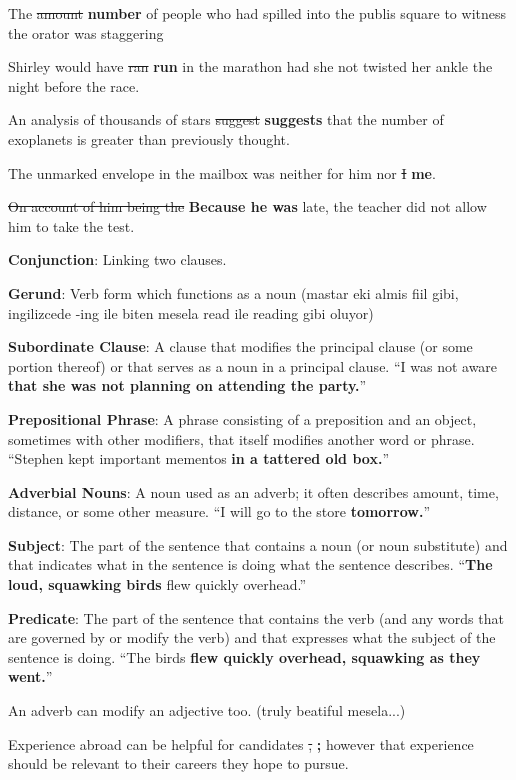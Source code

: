 \documentclass[12pt, a4paper]{ximera}
\begin{document}
The \sout{amount} \textbf{number} of people who had spilled into the publis square to witness the orator was staggering

Shirley would have \sout{ran} \textbf{run} in the marathon had she not twisted her ankle the night before the race.

An analysis of thousands of stars \sout{suggest} \textbf{suggests} that the number of exoplanets is greater than previously thought.

The unmarked envelope in the mailbox was neither for him nor \sout{I} \textbf{me}.

\sout{On account of him being the} \textbf{Because he was} late, the teacher did not allow him to take the test.

\textbf{Conjunction}: Linking two clauses.

\textbf{Gerund}: Verb form which functions as a noun (mastar eki almis fiil gibi, ingilizcede -ing ile biten mesela read ile reading gibi oluyor)

\textbf{Subordinate Clause}: A clause that modifies the principal clause (or some portion thereof) or that serves as a noun in a principal clause. ``I was not aware \textbf{that she was not planning on attending the party.}''

\textbf{Prepositional Phrase}: A phrase consisting of a preposition and an object, sometimes with other modifiers, that itself modifies another word or phrase. ``Stephen kept important mementos \textbf{in a tattered old box.}''

\textbf{Adverbial Nouns}: A noun used as an adverb; it often describes amount, time, distance, or some other measure. ``I will go to the store \textbf{tomorrow.}''

\textbf{Subject}: The part of the sentence that contains a noun (or noun substitute) and that indicates what in the sentence is doing what the sentence describes. ``\textbf{The loud, squawking birds} flew quickly overhead.''

\textbf{Predicate}: The part of the sentence that contains the verb (and any words that are governed by or modify the verb) and that expresses what the subject of the sentence is doing. ``The birds \textbf{flew quickly overhead, squawking as they went.}''

An adverb can modify an adjective too. (truly beatiful mesela...)

Experience abroad can be helpful for candidates \sout{,} \textbf{;} however that experience should be relevant to their careers they hope to pursue.
\end{document}
